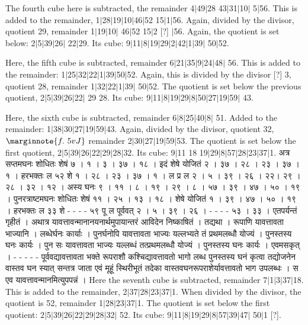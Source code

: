 \documentclass[11pt,a5paper]{book}
\def\danda{$|$}
\begin{document}
The fourth cube here is subtracted, the remainder 4\danda 49\danda 28 43\danda 31\danda 10\danda
5\danda 56. This is added to the remainder, 1\danda 28\danda 19\danda 10\danda 46\danda 52
15\danda 1\danda 56. Again, divided by the divisor, quotient 29, remainder 1\danda 19\danda 10\danda
46\danda 52 15\danda 2 [?] \danda 56. Again, the quotient is set below: 2\danda 5\danda 39\danda 26\danda
22\danda 29. Its cube: 9\danda 11\danda 8\danda 19\danda 29\danda 2\danda 42\danda 1\danda 39\danda
50\danda 52. 

Here, the fifth cube is subtracted, remainder 6\danda 21\danda 35\danda 9\danda 24\danda 48\danda
56. This is added to the remainder: 1\danda 25\danda 32\danda 22\danda 1\danda 39\danda 50\danda 52.
Again, this is divided by the divisor [?] 3, quotient 28, remainder 1\danda 32\danda 22\danda 1\danda 39\danda
50\danda 52. The quotient is set below the previous quotient, 2\danda 5\danda 39\danda 26\danda 22\danda
29 28. Its cube: 9\danda 11\danda 8\danda 19\danda 29\danda 8\danda 50\danda 27\danda 19\danda 59\danda
43. 

Here, the sixth cube is subtracted, remainder 6\danda 8\danda 25\danda 40\danda 8\danda
51. Added to the remainder: 1\danda 38\danda 30\danda 27\danda 19\danda 59\danda 43. Again, divided 
by the divisor, quotient 32,
$\marginnote{f.~5v J}$
remainder 2\danda 30\danda 27\danda 19\danda 59\danda 53. The quotient is set below the first
quotient, 2\danda 5\danda 39\danda 26\danda 22\danda 29\danda 28\danda 32. Its cube: 
9\danda 11 18 19\danda 29\danda 8\danda 57\danda 28\danda 23\danda 37\danda 1.
\newpage
{\s अत्र सप्तमघनः शोधितः शेषं ७ । १ । ३ । ३७ । १८ । 
इदं शेषे योजितं २ । ३७ । २८ । २३ । ३७ । १ । 
हरभक्तः ल ५२ शे १ । २८ । २३ । ३७ । १ । ल प्र ल २ । ५ । ३९ । २६ । २२। २९ । २८ । ३२ । १२ । 
अस्य घनः ९ । ११ । ८ । १९ । २९ । ८ । ५७ । ३९ । ४७ । ५० । १९ । 
पुनरत्राष्टमघनः शोधितः शेषं ११ । २५ । १३ । १८ । 
शेषे योजितं १ । ३९ । ४७ । ५० । १९ । 
हरभक्तः ल ३३ शे - - - - ५९ पू ल पूर्ववत् २ । ५ । ३९ । २६ । - - - - ५३ । ३३ । 
एतपर्यन्तं गृहीतं । अथात्र यावत्तावन्मानानयनार्थमुपायान्तरं आविदेन निष्काषितं । तद्यथा । 
रूपाणि यावत्तावता भाज्यानि । लब्धेर्घनः कार्याः । पुनर्घनोपि यावत्तावता भाज्यः यल्लभ्यते तं प्रथमलब्धौ योज्यं । 
पुनस्तस्य घनः कार्यः । पुन सः यावत्तावता भाज्यः यल्लब्धं तत्प्रथमलब्धौ योज्यं । पुनस्तस्य घनः कार्यः । 
एवमसकृत् । - - - - - पूर्ववद्यावत्तावता भक्ते रूपराशौ कश्चिद्यावत्तावतो भागो लब्ध
पुनस्तस्य घनं कृत्वा तद्योजनेन वास्तव घन स्यात् सन्तत्र जाता एवं मूहूं स्थिरीभूतं तदेका 
वास्तवघनरूपराशेर्यावत्तावतो भाग उपलब्धः । स एव यावत्तावन्मानमित्युपपन्नं । }
\newpage
Here the seventh cube is subtracted, remainder 7\danda 1\danda 3\danda 37\danda 18. 
This is added to the remainder, 2\danda 37\danda 28\danda 23\danda 37\danda 1.
When divided by the divisor, the quotient is 52, remainder 
1\danda 28\danda 23\danda 37\danda 1. The quotient 
is set below the first quotient: 2\danda 5\danda 39\danda 26\danda 22\danda 29\danda 28\danda 32\danda
52. Its cube: 9\danda 11\danda 8\danda 19\danda 29\danda 8\danda 57\danda 39\danda 47\danda
50\danda 1 [?]. 
\end{document}
